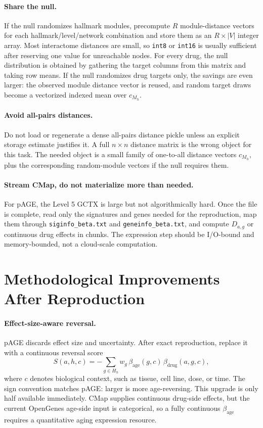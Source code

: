 \documentclass[11pt]{article}
\begin{document}
\paragraph{Share the null.}
If the null randomizes hallmark modules, precompute \(R\) module-distance
vectors for each hallmark/level/network combination and store them as an
\(R\times |V|\) integer array. Most interactome distances are small, so
\texttt{int8} or \texttt{int16} is usually sufficient after reserving one value
for unreachable nodes. For every drug, the null distribution is obtained by
gathering the target columns from this matrix and taking row means. If the null
randomizes drug targets only, the savings are even larger: the observed module
distance vector is reused, and random target draws become a vectorized indexed
mean over \(c_{M_h}\).

\paragraph{Avoid all-pairs distances.}
Do not load or regenerate a dense all-pairs distance pickle unless an explicit
storage estimate justifies it. A full \(n\times n\) distance matrix is the wrong
object for this task. The needed object is a small family of one-to-all
distance vectors \(c_{M_h}\), plus the corresponding random-module vectors if
the null requires them.

\paragraph{Stream CMap, do not materialize more than needed.}
For pAGE, the Level 5 GCTX is large but not algorithmically hard. Once the file
is complete, read only the signatures and genes needed for the reproduction,
map them through \texttt{siginfo\_beta.txt} and \texttt{geneinfo\_beta.txt},
and compute \(D_{a,g}\) or continuous drug effects in chunks. The expression
step should be I/O-bound and memory-bounded, not a cloud-scale computation.

\section{Methodological Improvements After Reproduction}

\paragraph{Effect-size-aware reversal.}
pAGE discards effect size and uncertainty. After exact reproduction, replace it
with a continuous reversal score
\[
  S(a,h,c) =
  -\sum_{g\in H_h} w_g\,\beta_{\mathrm{age}}(g,c)\,
  \beta_{\mathrm{drug}}(a,g,c),
\]
where \(c\) denotes biological context, such as tissue, cell line, dose, or
time. The sign convention matches pAGE: larger is more age-reversing. This
upgrade is only half available immediately. CMap supplies continuous drug-side
effects, but the current OpenGenes age-side input is categorical, so a fully
continuous \(\beta_{\mathrm{age}}\) requires a quantitative aging expression
resource.
\end{document}
